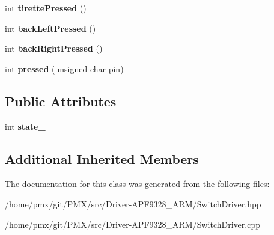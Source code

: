 \begin{DoxyCompactItemize}
int {\bfseries tirette\+Pressed} ()
\item 
\mbox{\label{classSwitchDriver_a97cf6ca8501fbd0ca937c366b32ee191}} 
int {\bfseries back\+Left\+Pressed} ()
\item 
\mbox{\label{classSwitchDriver_af20343abbad7e959ce0fadb3c8bdb145}} 
int {\bfseries back\+Right\+Pressed} ()
\item 
\mbox{\label{classSwitchDriver_a379d72f1adda71986eda15ac793e47b2}} 
int {\bfseries pressed} (unsigned char pin)
\end{DoxyCompactItemize}
\subsection*{Public Attributes}
\begin{DoxyCompactItemize}
\item 
\mbox{\label{classSwitchDriver_ae78d1b98589f3e65840e82361e9e0b59}} 
int {\bfseries state\+\_\+}
\end{DoxyCompactItemize}
\subsection*{Additional Inherited Members}


The documentation for this class was generated from the following files\+:\begin{DoxyCompactItemize}
\item 
/home/pmx/git/\+P\+M\+X/src/\+Driver-\/\+A\+P\+F9328\+\_\+\+A\+R\+M/Switch\+Driver.\+hpp\item 
/home/pmx/git/\+P\+M\+X/src/\+Driver-\/\+A\+P\+F9328\+\_\+\+A\+R\+M/Switch\+Driver.\+cpp\end{DoxyCompactItemize}
